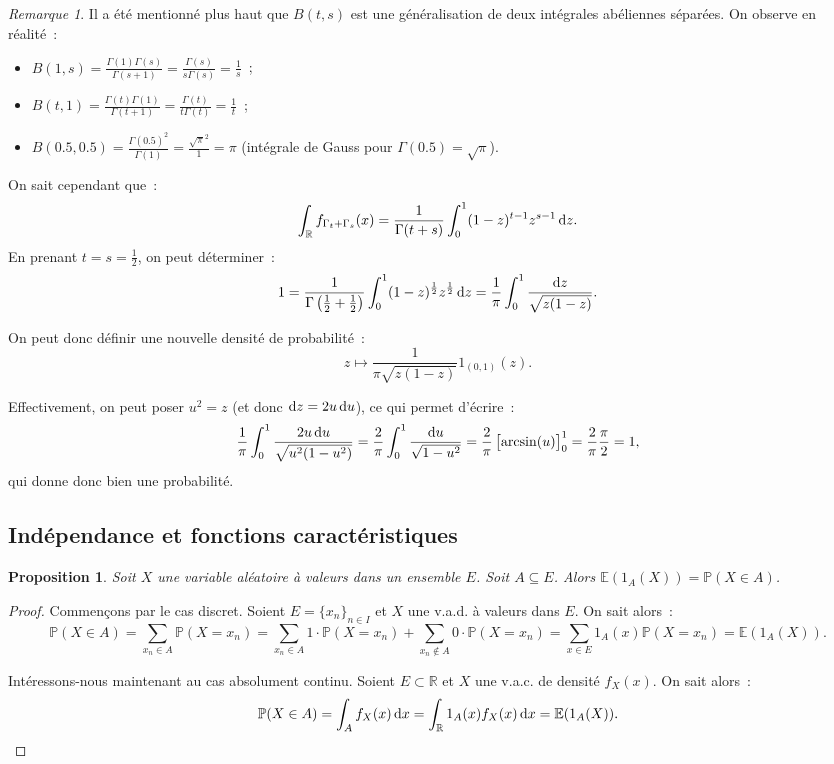 \documentclass{article}
\newcommand{\E}{\mathbb E}
\renewcommand{\P}{\mathbb P}
\newcommand{\R}{\mathbb R}
\newtheorem{prp}[thm]{Proposition}
\theoremstyle{definition}
\theoremstyle{remark}
\newtheorem*{rmq}{Remarque}
\begin{document}
		\begin{rmq} Il a été mentionné plus haut que $B(t, s)$ est une généralisation de deux intégrales abéliennes séparées. On observe en réalité~:
		\begin{itemize}
			\item $B(1, s) = \frac {\Gamma(1)\Gamma(s)}{\Gamma(s+1)} = \frac {\Gamma(s)}{s\Gamma(s)} = \frac 1s$~;
			\item $B(t, 1) = \frac {\Gamma(t)\Gamma(1)}{\Gamma(t+1)} = \frac {\Gamma(t)}{t\Gamma(t)} = \frac 1t$~;
			\item $B(0.5, 0.5) = \frac {\Gamma(0.5)^2}{\Gamma(1)} = \frac {\sqrt \pi^2}1 = \pi$ (intégrale de Gauss pour $\Gamma(0.5) = \sqrt \pi$).
		\end{itemize}

		On sait cependant que~:
		\[\int_\R f_{\Gamma_t+\Gamma_s}(x) = \frac 1{\Gamma(t+s)}\int_0^1(1-z)^{t-1}z^{s-1}\dif z.\]
		En prenant $t = s = \frac 12$, on peut déterminer~:
		\[1 = \frac 1{\Gamma\left(\frac 12 + \frac 12\right)}\int_0^1(1-z)^{\frac 12}z^{\frac 12}\dif z = \frac 1\pi\int_0^1\frac {\dif z}{\sqrt {z(1-z)}}.\]

		On peut donc définir une nouvelle densité de probabilité~:
		\[z \mapsto \frac {1}{\pi\sqrt{z(1-z)}}1_{(0, 1)}(z).\]

		Effectivement, on peut poser $u^2 = z$ (et donc $\dif z = 2u\dif u$), ce qui permet d'écrire~:
		\[\frac 1\pi\int_0^1\frac {2u\dif u}{\sqrt {u^2(1-u^2)}} = \frac 2\pi\int_0^1\frac {\dif u}{\sqrt {1-u^2}} = \frac 2\pi\left[\arcsin(u)\right]_0^1
		= \frac 2\pi\frac \pi 2 = 1,\]
		qui donne donc bien une probabilité.
		\end{rmq}
	
	\subsection{Indépendance et fonctions caractéristiques}
		\begin{prp} Soit $X$ une variable aléatoire à valeurs dans un ensemble $E$. Soit $A \subseteq E$. Alors $\E(1_A(X)) = \P(X \in A)$. \end{prp}

		\begin{proof} Commençons par le cas discret. Soient $E = \{x_n\}_{n \in I}$ et $X$ une v.a.d. à valeurs dans $E$. On sait alors~:
		\[\P(X \in A) = \sum_{x_n \in A}\P(X = x_n) = \sum_{x_n \in A}1 \cdot \P(X = x_n) + \sum_{x_n \not \in A}0 \cdot \P(X=x_n)
		= \sum_{x \in E}1_A(x)\P(X=x_n) = \E(1_A(X)).\]

		Intéressons-nous maintenant au cas absolument continu. Soient $E \subset \R$ et $X$ une v.a.c. de densité $f_X(x)$. On sait alors~:
		\[\P(X \in A) = \int_Af_X(x)\dif x = \int_\R 1_A(x)f_X(x)\dif x = \E(1_A(X)).\]
		\end{proof}
\end{document}

